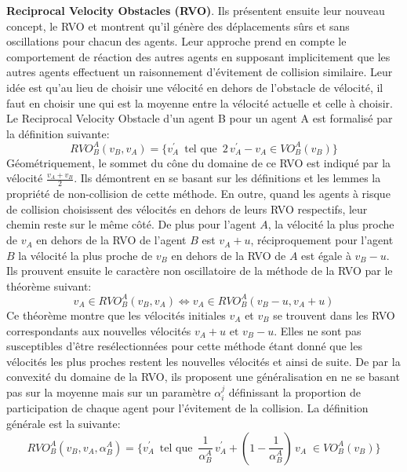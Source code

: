 \documentclass[11pt]{article}
\begin{document}
\textbf{Reciprocal Velocity Obstacles (RVO)}. Ils présentent ensuite leur nouveau concept, le RVO et montrent qu'il génère des déplacements sûrs et sans oscillations pour chacun des agents. Leur approche prend en compte le comportement de réaction des autres agents en supposant implicitement que les autres agents effectuent un raisonnement d'évitement de collision similaire. Leur idée est qu'au lieu de choisir une vélocité en dehors de l'obstacle de vélocité, il faut en choisir une qui est la moyenne entre la vélocité actuelle et celle à choisir. Le Reciprocal Velocity Obstacle d'un agent B pour un agent A est formalisé par la définition suivante:
\[
RVO_B^A(v_B, v_A) = \{ v_A^\prime \,\mbox{ tel que }\, 2\,v_A^\prime - v_A \in VO_B^A(v_B) \}
\]
Géométriquement, le sommet du cône du domaine de ce RVO est indiqué par la vélocité $\frac{v_A + v_B}{2}$. Ils démontrent en se basant sur les définitions et les lemmes la propriété de non-collision de cette méthode. En outre, quand les agents à risque de collision choisissent des vélocités en dehors de leurs RVO respectifs, leur chemin reste sur le même côté. De plus pour l'agent $A$, la vélocité la plus proche de $v_A$ en dehors de la RVO de  l'agent $B$ est $v_A+u$, réciproquement pour l'agent $B$ la vélocité la plus proche de $v_B$ en dehors de la RVO de $A$ est égale à $v_B-u$. Ils prouvent ensuite le caractère non oscillatoire de la méthode de la RVO par le théorème suivant:
\[
v_A \in RVO_B^A(v_B, v_A) \Leftrightarrow v_A \in RVO_B^A(v_B-u, v_A+u)
\]
Ce théorème montre que les vélocités initiales $v_A$ et $v_B$ se trouvent dans les RVO correspondants aux nouvelles vélocités $v_A+u \mbox{ et } v_B-u$. Elles ne sont pas susceptibles d'être resélectionnées pour cette méthode étant donné que les vélocités les plus proches restent les nouvelles vélocités et ainsi de suite. De par la convexité du domaine de la RVO, ils proposent une généralisation en ne se basant pas sur la moyenne mais sur un paramètre $\alpha_i^j$ définissant la proportion de participation de chaque agent pour l'évitement de la collision. La définition générale est la suivante:
\[
RVO_B^A(v_B, v_A, \alpha_B^A) =  \{ v_A^\prime \,\mbox{ tel que }\, \frac{1}{\alpha_B^A}\, v_A^\prime + (1 - \frac{1}{\alpha_B^A})\,v_A \;\in VO_B^A(v_B) \}
\]
\end{document}
